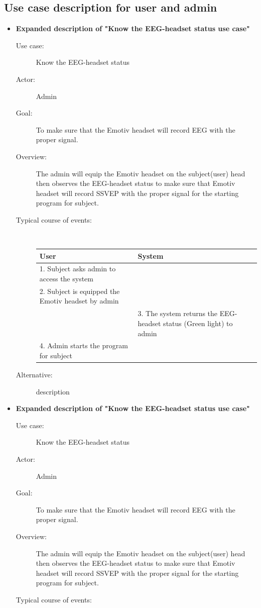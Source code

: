 \subsection{Use case description for user and admin}
\begin{itemize}
\item \textbf{Expanded description of "Know the EEG-headset status
use case" }

\begin{description}
\item [{Use case:}] Know the EEG-headset status 
\item [{Actor:}] Admin 
\item [{Goal:}] To make sure that the Emotiv headset will record EEG with
the proper signal. 
\item [{Overview:}] The admin will equip the Emotiv headset on the subject(user)
head then observes the EEG-headset status to make sure that Emotiv
headset will record SSVEP with the proper signal for the starting
program for subject. 
\item [{Typical course of events:}]~

{
	\centering

	\begin{tabular}{| m{.47\linewidth} | m{.47\linewidth} |}
		
	\hline 
	\textbf{User} & \textbf{System}  \\
	\hline 
	1. Subject asks admin to access the system &   \\
	\hline 
	2. Subject is equipped the Emotiv headset by admin  &   \\
	\hline 
	& 3. The system returns the EEG-headset status (Green light) to admin \\
	\hline 
	4. Admin starts the program for subject & \\
	\hline 
	
	\end{tabular}
}
\item[Alternative:] description

\end{description}
\item \textbf{Expanded description of "Know the EEG-headset status
	use case" }

\begin{description}
	\item [{Use case:}] Know the EEG-headset status 
	\item [{Actor:}] Admin 
	\item [{Goal:}] To make sure that the Emotiv headset will record EEG with
	the proper signal. 
	\item [{Overview:}] The admin will equip the Emotiv headset on the subject(user)
	head then observes the EEG-headset status to make sure that Emotiv
	headset will record SSVEP with the proper signal for the starting
	program for subject. 
	\item [{Typical course of events:}]~
	

\end{description}
\end{itemize}
